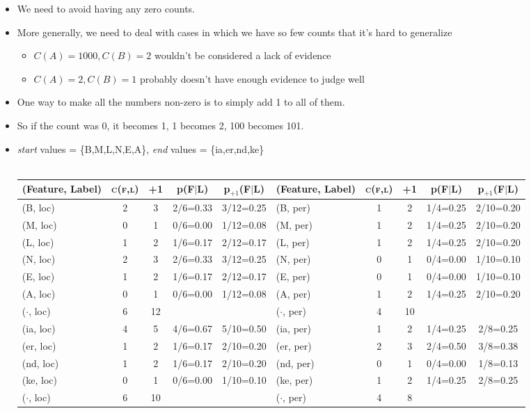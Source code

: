 \documentclass[11pt,letterpaper]{article}
\begin{document}
\begin{itemize}
  \item We need to avoid having any zero counts.
  \item More generally, we need to deal with cases in which we have so few counts that it's hard to generalize
    \begin{itemize}
      \item $C(A)=1000, C(B)=2$ wouldn't be considered a lack of evidence
      \item $C(A)=2, C(B)=1$ probably doesn't have enough evidence to judge well
    \end{itemize}

  \item One way to make all the numbers non-zero is to simply add 1 to all of them.
  \item So if the count was 0, it becomes 1, 1 becomes 2, 100 becomes 101.
  \item \textit{start} values = \{B,M,L,N,E,A\}, \textit{end} values = \{ia,er,nd,ke\} \\\\
   \begin{tabular}{|p{15mm}cccc|p{15mm}cccc|}
     \hline
     (Feature, Label) & \textsc{c(f,l)} & +1 & p(F$\mid$L) & p$_{+1}$(F$\mid$L) & (Feature, Label) & \textsc{c(f,l)} & +1 & p(F$\mid$L) & p$_{+1}$(F$\mid$L) \\
     \hline
     \hline
     (B, loc) & 2 & 3 & 2/6=0.33 & 3/12=0.25  &  (B, per) & 1 & 2 & 1/4=0.25 & 2/10=0.20  \\
     (M, loc) & 0 & 1 & 0/6=0.00 & 1/12=0.08  &  (M, per) & 1 & 2 & 1/4=0.25 & 2/10=0.20  \\
     (L, loc) & 1 & 2 & 1/6=0.17 & 2/12=0.17  &  (L, per) & 1 & 2 & 1/4=0.25 & 2/10=0.20  \\
     (N, loc) & 2 & 3 & 2/6=0.33 & 3/12=0.25  &  (N, per) & 0 & 1 & 0/4=0.00 & 1/10=0.10  \\
     (E, loc) & 1 & 2 & 1/6=0.17 & 2/12=0.17  &  (E, per) & 0 & 1 & 0/4=0.00 & 1/10=0.10  \\
     (A, loc) & 0 & 1 & 0/6=0.00 & 1/12=0.08  &  (A, per) & 1 & 2 & 1/4=0.25 & 2/10=0.20  \\
     \hline
     ($\cdot$, loc) & 6 & 12 & &             & ($\cdot$, per) & 4 & 10 & & \\
     \hline
     \hline
     (ia, loc) & 4 & 5 & 4/6=0.67 & 5/10=0.50  &  (ia, per) & 1 & 2 & 1/4=0.25 & 2/8=0.25  \\
     (er, loc) & 1 & 2 & 1/6=0.17 & 2/10=0.20  &  (er, per) & 2 & 3 & 2/4=0.50 & 3/8=0.38  \\
     (nd, loc) & 1 & 2 & 1/6=0.17 & 2/10=0.20  &  (nd, per) & 0 & 1 & 0/4=0.00 & 1/8=0.13  \\
     (ke, loc) & 0 & 1 & 0/6=0.00 & 1/10=0.10  &  (ke, per) & 1 & 2 & 1/4=0.25 & 2/8=0.25  \\
     \hline
     ($\cdot$, loc) & 6 & 10 & &              & ($\cdot$, per) & 4 & 8 & & \\
     \hline
   \end{tabular}\\


\end{itemize}
\end{document}
